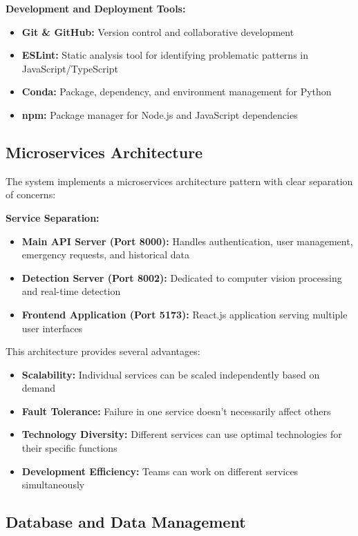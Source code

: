 \documentclass[conference]{IEEEtran}
\begin{document}
\textbf{Development and Deployment Tools:}
\begin{itemize}
\item \textbf{Git \& GitHub:} Version control and collaborative development
\item \textbf{ESLint:} Static analysis tool for identifying problematic patterns in JavaScript/TypeScript
\item \textbf{Conda:} Package, dependency, and environment management for Python
\item \textbf{npm:} Package manager for Node.js and JavaScript dependencies
\end{itemize}

\subsection{Microservices Architecture}

The system implements a microservices architecture pattern with clear separation of concerns:

\textbf{Service Separation:}
\begin{itemize}
\item \textbf{Main API Server (Port 8000):} Handles authentication, user management, emergency requests, and historical data
\item \textbf{Detection Server (Port 8002):} Dedicated to computer vision processing and real-time detection
\item \textbf{Frontend Application (Port 5173):} React.js application serving multiple user interfaces
\end{itemize}

This architecture provides several advantages:
\begin{itemize}
\item \textbf{Scalability:} Individual services can be scaled independently based on demand
\item \textbf{Fault Tolerance:} Failure in one service doesn't necessarily affect others
\item \textbf{Technology Diversity:} Different services can use optimal technologies for their specific functions
\item \textbf{Development Efficiency:} Teams can work on different services simultaneously
\end{itemize}

\subsection{Database and Data Management}
\end{document}

